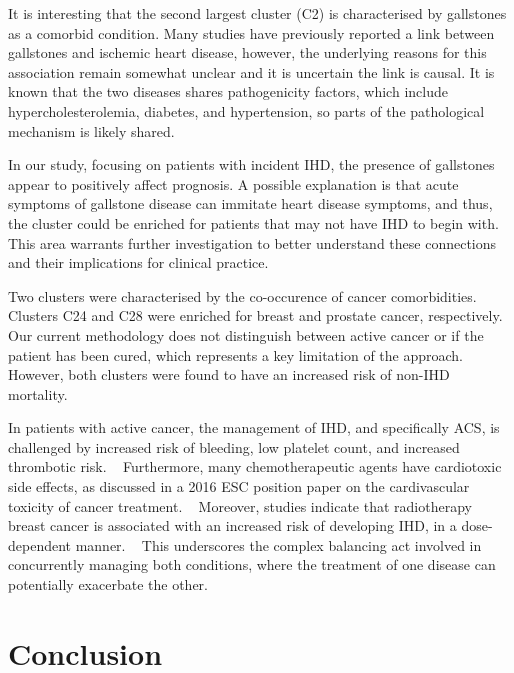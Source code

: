 It is interesting that the second largest cluster (C2)
is characterised by gallstones as a comorbid condition.
Many studies have previously reported a link between
gallstones and ischemic heart disease,
\autocite{zhengGallstones2016}
\autocite{upalaGallstone2017}
\autocite{wirthPresence2015}
however, the underlying reasons for this association remain
somewhat unclear and it is uncertain the link is causal.
It is known that the two diseases shares pathogenicity factors,
which include hypercholesterolemia, diabetes, and hypertension,
so parts of the pathological mechanism is likely shared.
\autocite{zhengGallstones2016}

In our study, focusing on patients with incident \ac{IHD},
the presence of gallstones appear to positively affect prognosis.
A possible explanation is that acute symptoms of gallstone disease
can immitate heart disease symptoms, and thus, the cluster could be 
enriched for patients that may not have \ac{IHD} to begin with.
This area warrants further investigation to better understand these connections
and their implications for clinical practice.

Two clusters were characterised by the co-occurence of cancer comorbidities.
Clusters C24 and C28 were enriched for breast and prostate cancer, 
respectively.
Our current methodology does not distinguish between active cancer
or if the patient has been cured, which represents a key limitation
of the approach.
However, both clusters were found to have an increased risk of 
non-\ac{IHD} mortality.

In patients with active cancer,
the management of \ac{IHD}, and specifically \ac{ACS}, 
is challenged by increased risk of bleeding,
low platelet count, and increased thrombotic risk.
~\autocite{byrne20232023}
Furthermore, 
many chemotherapeutic agents have cardiotoxic side effects,
as discussed in a 2016 \ac{ESC} position paper on the 
cardivascular toxicity of cancer treatment.
~\autocite{zamorano20162016}
Moreover,
studies indicate that radiotherapy breast cancer
is associated with an increased risk of developing \ac{IHD}, 
in a dose-dependent manner.
~\autocite{darbyRisk2013}
This underscores the complex balancing act involved in concurrently managing
both conditions, where the treatment of one disease can potentially exacerbate
the other.

\section{Conclusion}

